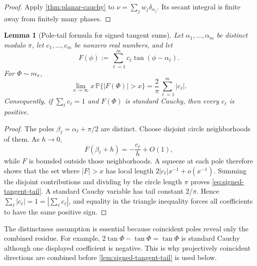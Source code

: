 \documentclass[11pt]{article}
\numberwithin{equation}{section}
\theoremstyle{thmstyleone}%
\newtheorem{lemma}[lemma]{Lemma}
\theoremstyle{thmstyletwo}%
\let\cref\autoref
\newcommand{\Prb}{\mathbb P}
\begin{document}
\begin{proof}
Apply \cref{thm:planar-cauchy} to
\(\nu=\sum_jw_j\delta_{\alpha_j}\).  Its secant integral is finite away
from finitely many phases.
\end{proof}

\begin{lemma}[Pole-tail formula for signed tangent sums]
\label{lem:signed-tangent-tail}
Let \(\alpha_1,\ldots,\alpha_m\) be distinct modulo \(\pi\), let
\(c_1,\ldots,c_m\) be nonzero real numbers, and let
\[
  F(\phi):=\sum_{\ell=1}^m c_\ell\tan(\phi-\alpha_\ell).
\]
For \(\Phi\sim m_\pi\),
\begin{equation}
  \lim_{x\to\infty}
  x\,\Prb\{|F(\Phi)|>x\}
  =
  \frac2\pi\sum_{\ell=1}^m|c_\ell|.
  \label{eq:signed-tangent-tail}
\end{equation}
Consequently, if \(\sum_\ell c_\ell=1\) and \(F(\Phi)\) is standard
Cauchy, then every \(c_\ell\) is positive.
\end{lemma}

\begin{proof}
The poles \(\beta_\ell=\alpha_\ell+\pi/2\) are distinct.  Choose disjoint
circle neighborhoods of them.  As \(h\to0\),
\[
  F(\beta_\ell+h)=-\frac{c_\ell}{h}+O(1),
\]
while \(F\) is bounded outside those neighborhoods.  A squeeze at each pole
therefore shows that the set where \(|F|>x\) has local length
\(2|c_\ell|x^{-1}+o(x^{-1})\).  Summing the disjoint contributions and
dividing by the circle length \(\pi\) proves
\cref{eq:signed-tangent-tail}.  A standard Cauchy variable has tail
constant \(2/\pi\).  Hence
\(\sum_\ell|c_\ell|=1=|\sum_\ell c_\ell|\), and equality in the triangle
inequality forces all coefficients to have the same positive sign.
\end{proof}

The distinctness assumption is essential because coincident poles reveal
only the combined residue.  For example,
\(2\tan\Phi-\tan\Phi=\tan\Phi\) is standard Cauchy although one displayed
coefficient is negative.  This is why projectively coincident directions
are combined before \cref{lem:signed-tangent-tail} is used below.
\end{document}
